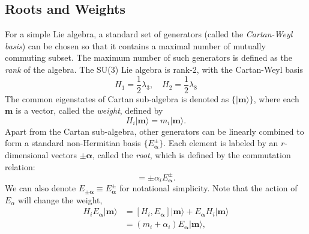 \subsection{Roots and Weights}
For a simple Lie algebra, a standard set of generators (called the \textit{Cartan-Weyl basis}) can be chosen so that it contains a maximal number of mutually commuting subset.
The maximum number of such generators is defined as the \textit{rank} of the algebra.
The SU(3) Lie algebra is rank-2, with the Cartan-Weyl basis
\begin{equation}
	H_1 = \frac{1}{2}\lambda_3, \quad H_2 = \frac{1}{2}\lambda_8
\end{equation}
The common eigenstates of Cartan sub-algebra is denoted as $\{|\bm m\rangle\}$, where each $\bm m$ is a vector, called the \textit{weight}, defined by
\begin{equation}
	H_i |\bm m\rangle = m_i |\bm m\rangle.
\end{equation}
Apart from the Cartan sub-algebra, other generators can be linearly combined to form a standard non-Hermitian basis $\{E^\pm_{\bm \alpha}\}$.
Each element is labeled by an $r$-dimensional vectors $\pm \bm\alpha$, called the \textit{root}, which is defined by the commutation relation:
\begin{equation}
	[H_i, E_{\bm \alpha}^\pm] = \pm \alpha_i E^\pm_{\bm \alpha}.
\end{equation}
We can also denote $E_{\pm\bm{\alpha}} \equiv E_{\bm{\alpha}}^\pm$ for notational simplicity.
Note that the action of $E_\alpha$ will change the weight,
\begin{equation}
\begin{aligned}
	H_i E_{\bm \alpha}|\bm m\rangle 
	&= [H_i, E_{\bm \alpha}]|\bm m\rangle + E_{\bm \alpha} H_i |\bm m\rangle \\
	&= (m_i + \alpha_i) E_{\bm \alpha}|\bm m\rangle,
\end{aligned}
\end{equation}

